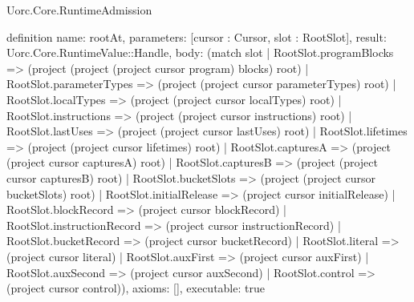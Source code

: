 \begin{lexlean}{Uorc.Core.RuntimeAdmission}
\begin{semanticmodule}
definition{
  name: rootAt,
  parameters: [cursor : Cursor, slot : RootSlot],
  result: Uorc.Core.RuntimeValue::Handle,
  body: (match slot
    | RootSlot.programBlocks => (project (project (project cursor program) blocks) root)
    | RootSlot.parameterTypes => (project (project cursor parameterTypes) root)
    | RootSlot.localTypes => (project (project cursor localTypes) root)
    | RootSlot.instructions => (project (project cursor instructions) root)
    | RootSlot.lastUses => (project (project cursor lastUses) root)
    | RootSlot.lifetimes => (project (project cursor lifetimes) root)
    | RootSlot.capturesA => (project (project cursor capturesA) root)
    | RootSlot.capturesB => (project (project cursor capturesB) root)
    | RootSlot.bucketSlots => (project (project cursor bucketSlots) root)
    | RootSlot.initialRelease => (project cursor initialRelease)
    | RootSlot.blockRecord => (project cursor blockRecord)
    | RootSlot.instructionRecord => (project cursor instructionRecord)
    | RootSlot.bucketRecord => (project cursor bucketRecord)
    | RootSlot.literal => (project cursor literal)
    | RootSlot.auxFirst => (project cursor auxFirst)
    | RootSlot.auxSecond => (project cursor auxSecond)
    | RootSlot.control => (project cursor control)),
  axioms: [],
  executable: true
}


\end{semanticmodule}
\end{lexlean}
